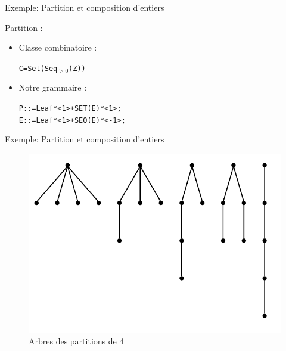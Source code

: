 \documentclass{beamer}
\begin{document}
\begin{frame}{Exemple: Partition et composition d'entiers}

\begin{block}{Partition :}
\begin{itemize}
\item Classe combinatoire :\\
\begin{alltt}
\hspace{10 mm} C = Set(Seq$_{>0}$(Z)) \\
\end{alltt}
\item Notre grammaire : \\
\begin{alltt}
\hspace{10 mm} P ::= Leaf * <1> + SET(E) * <1>; \\
\hspace{10 mm} E ::= Leaf * <1> + SEQ(E) * <-1>; \\
\end{alltt}
\end{itemize}
\end{block}
\end{frame}


\begin{frame}{Exemple: Partition et composition d'entiers}
\begin{figure}[h]
  \centering
  \includegraphics[scale=0.3]{chart1.png}
  \caption{Arbres des partitions de 4}
\end{figure}
\end{frame}
\end{document}
